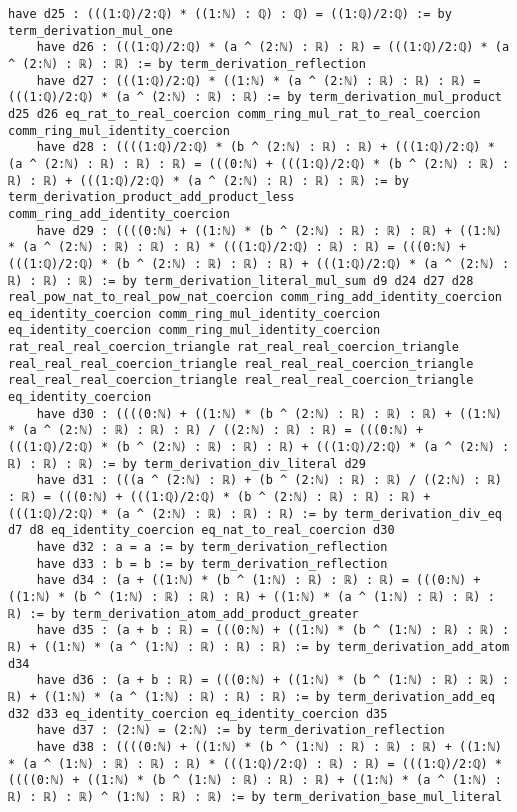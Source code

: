 \documentclass{article}
\begin{document}
\begin{tcolorbox}[colback=white!10, width=\linewidth]
\begin{lstlisting}[language=Lean4]
    have d25 : (((1:ℚ)/2:ℚ) * ((1:ℕ) : ℚ) : ℚ) = ((1:ℚ)/2:ℚ) := by term_derivation_mul_one
    have d26 : (((1:ℚ)/2:ℚ) * (a ^ (2:ℕ) : ℝ) : ℝ) = (((1:ℚ)/2:ℚ) * (a ^ (2:ℕ) : ℝ) : ℝ) := by term_derivation_reflection
    have d27 : (((1:ℚ)/2:ℚ) * ((1:ℕ) * (a ^ (2:ℕ) : ℝ) : ℝ) : ℝ) = (((1:ℚ)/2:ℚ) * (a ^ (2:ℕ) : ℝ) : ℝ) := by term_derivation_mul_product d25 d26 eq_rat_to_real_coercion comm_ring_mul_rat_to_real_coercion comm_ring_mul_identity_coercion
    have d28 : ((((1:ℚ)/2:ℚ) * (b ^ (2:ℕ) : ℝ) : ℝ) + (((1:ℚ)/2:ℚ) * (a ^ (2:ℕ) : ℝ) : ℝ) : ℝ) = (((0:ℕ) + (((1:ℚ)/2:ℚ) * (b ^ (2:ℕ) : ℝ) : ℝ) : ℝ) + (((1:ℚ)/2:ℚ) * (a ^ (2:ℕ) : ℝ) : ℝ) : ℝ) := by term_derivation_product_add_product_less comm_ring_add_identity_coercion
    have d29 : ((((0:ℕ) + ((1:ℕ) * (b ^ (2:ℕ) : ℝ) : ℝ) : ℝ) + ((1:ℕ) * (a ^ (2:ℕ) : ℝ) : ℝ) : ℝ) * (((1:ℚ)/2:ℚ) : ℝ) : ℝ) = (((0:ℕ) + (((1:ℚ)/2:ℚ) * (b ^ (2:ℕ) : ℝ) : ℝ) : ℝ) + (((1:ℚ)/2:ℚ) * (a ^ (2:ℕ) : ℝ) : ℝ) : ℝ) := by term_derivation_literal_mul_sum d9 d24 d27 d28 real_pow_nat_to_real_pow_nat_coercion comm_ring_add_identity_coercion eq_identity_coercion comm_ring_mul_identity_coercion eq_identity_coercion comm_ring_mul_identity_coercion rat_real_real_coercion_triangle rat_real_real_coercion_triangle real_real_real_coercion_triangle real_real_real_coercion_triangle real_real_real_coercion_triangle real_real_real_coercion_triangle eq_identity_coercion
    have d30 : ((((0:ℕ) + ((1:ℕ) * (b ^ (2:ℕ) : ℝ) : ℝ) : ℝ) + ((1:ℕ) * (a ^ (2:ℕ) : ℝ) : ℝ) : ℝ) / ((2:ℕ) : ℝ) : ℝ) = (((0:ℕ) + (((1:ℚ)/2:ℚ) * (b ^ (2:ℕ) : ℝ) : ℝ) : ℝ) + (((1:ℚ)/2:ℚ) * (a ^ (2:ℕ) : ℝ) : ℝ) : ℝ) := by term_derivation_div_literal d29
    have d31 : (((a ^ (2:ℕ) : ℝ) + (b ^ (2:ℕ) : ℝ) : ℝ) / ((2:ℕ) : ℝ) : ℝ) = (((0:ℕ) + (((1:ℚ)/2:ℚ) * (b ^ (2:ℕ) : ℝ) : ℝ) : ℝ) + (((1:ℚ)/2:ℚ) * (a ^ (2:ℕ) : ℝ) : ℝ) : ℝ) := by term_derivation_div_eq d7 d8 eq_identity_coercion eq_nat_to_real_coercion d30
    have d32 : a = a := by term_derivation_reflection
    have d33 : b = b := by term_derivation_reflection
    have d34 : (a + ((1:ℕ) * (b ^ (1:ℕ) : ℝ) : ℝ) : ℝ) = (((0:ℕ) + ((1:ℕ) * (b ^ (1:ℕ) : ℝ) : ℝ) : ℝ) + ((1:ℕ) * (a ^ (1:ℕ) : ℝ) : ℝ) : ℝ) := by term_derivation_atom_add_product_greater
    have d35 : (a + b : ℝ) = (((0:ℕ) + ((1:ℕ) * (b ^ (1:ℕ) : ℝ) : ℝ) : ℝ) + ((1:ℕ) * (a ^ (1:ℕ) : ℝ) : ℝ) : ℝ) := by term_derivation_add_atom d34
    have d36 : (a + b : ℝ) = (((0:ℕ) + ((1:ℕ) * (b ^ (1:ℕ) : ℝ) : ℝ) : ℝ) + ((1:ℕ) * (a ^ (1:ℕ) : ℝ) : ℝ) : ℝ) := by term_derivation_add_eq d32 d33 eq_identity_coercion eq_identity_coercion d35
    have d37 : (2:ℕ) = (2:ℕ) := by term_derivation_reflection
    have d38 : ((((0:ℕ) + ((1:ℕ) * (b ^ (1:ℕ) : ℝ) : ℝ) : ℝ) + ((1:ℕ) * (a ^ (1:ℕ) : ℝ) : ℝ) : ℝ) * (((1:ℚ)/2:ℚ) : ℝ) : ℝ) = (((1:ℚ)/2:ℚ) * ((((0:ℕ) + ((1:ℕ) * (b ^ (1:ℕ) : ℝ) : ℝ) : ℝ) + ((1:ℕ) * (a ^ (1:ℕ) : ℝ) : ℝ) : ℝ) ^ (1:ℕ) : ℝ) : ℝ) := by term_derivation_base_mul_literal

\end{lstlisting}
\end{tcolorbox}
\end{document}
